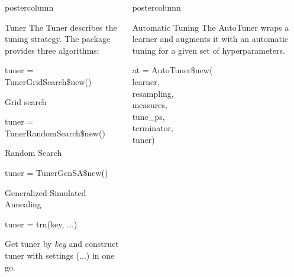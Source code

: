 \documentclass{beamer}
\newlength{\columnheight} %
\begin{document}
\begin{frame}[fragile]{}
\begin{columns}
\begin{column}{.245\textwidth}
			\begin{beamercolorbox}[center]{postercolumn}
				\begin{minipage}{.98\textwidth}
					\parbox[t][\columnheight]{\textwidth}{
						\begin{myblock}{Tuner}
							The Tuner describes the tuning strategy. The package provides three algorithms:
							\\
							\begin{codebox}
								tuner = TunerGridSearch\$new()
							\end{codebox}
							Grid search
							\\
							\begin{codebox}
								tuner = TunerRandomSearch\$new()
							\end{codebox}
							Random Search
							\\
							\begin{codebox}
								tuner = TunerGenSA\$new()
							\end{codebox}
							Generalized Simulated Annealing
							\\
							\begin{codebox}
								tuner = trn(key, ...)
							\end{codebox}
							Get tuner by \textit{key} and construct tuner with settings (...) in one go.
						\end{myblock}
					\vfill}
				\end{minipage}
			\end{beamercolorbox}
		\end{column}
		\begin{column}{.245\textwidth}
			\begin{beamercolorbox}[center]{postercolumn}
				\begin{minipage}{.98\textwidth}
					\parbox[t][\columnheight]{\textwidth}{
						\begin{myblock}{Automatic Tuning}
						The AutoTuner wraps a learner and augments it with an automatic tuning for a given set of hyperparameters. 
						\\
						\begin{codeboxmultiline}[width=18cm]
							at = AutoTuner\$new(
\\
							\hspace*{1ex}learner,
\\
							\hspace*{1ex}resampling,
\\
							\hspace*{1ex}measures,
\\
							\hspace*{1ex}tune\_ps,
\\
							\hspace*{1ex}terminator,
\\
							\hspace*{1ex}tuner)
						\end{codeboxmultiline}
						

\end{myblock}}
\end{minipage}
\end{beamercolorbox}
\end{column}
\end{columns}
\end{frame}
\end{document}
